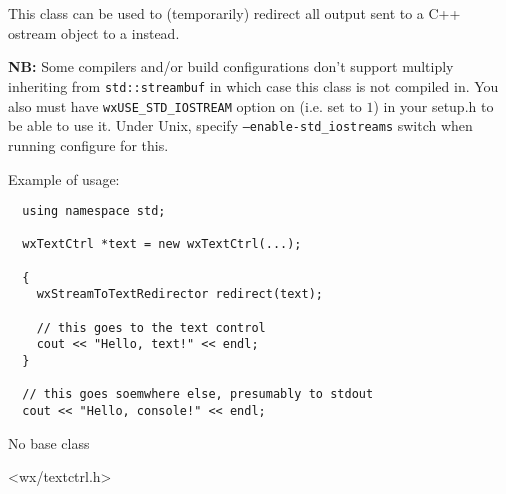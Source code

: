 
\section{}\label{wxstreamtotextredirector}

This class can be used to (temporarily) redirect all output sent to a C++
ostream object to a  instead.

{\bf NB:} Some compilers and/or build configurations don't support multiply
inheriting  from {\tt std::streambuf} in which
case this class is not compiled in. You also must have {\tt wxUSE\_STD\_IOSTREAM} 
option on (i.e. set to $1$) in your setup.h to be able to use it. Under Unix,
specify {\tt --enable-std\_iostreams} switch when running configure for this.

Example of usage:
{\small%
\begin{verbatim}
  using namespace std;

  wxTextCtrl *text = new wxTextCtrl(...);

  {
    wxStreamToTextRedirector redirect(text);

    // this goes to the text control
    cout << "Hello, text!" << endl;
  }

  // this goes soemwhere else, presumably to stdout
  cout << "Hello, console!" << endl;
\end{verbatim}
}%


No base class


<wx/textctrl.h>




\label{wxstreamtotextredirectorctor}

